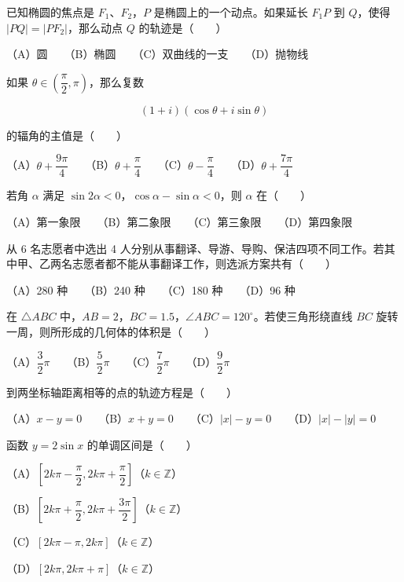 \begin{question}
已知椭圆的焦点是 $F_1\text{、}F_2$，$P$ 是椭圆上的一个动点。如果延长 $F_1P$ 到 $Q$，使得 $|PQ|=|PF_2|$，那么动点 $Q$ 的轨迹是\mbox{（　　）}

（A）圆　　（B）椭圆　　（C）双曲线的一支　　（D）抛物线

\end{question}
\begin{question}
如果 $\theta\in\left(\dfrac\pi2,\pi\right)$，那么复数

\nopagebreak[4]
\[
(1+i)(\cos\theta+i\sin\theta)
\]

的辐角的主值是\mbox{（　　）}

（A）$\theta+\dfrac{9\pi}{4}$　　（B）$\theta+\dfrac\pi4$　　（C）$\theta-\dfrac\pi4$　　（D）$\theta+\dfrac{7\pi}{4}$

\end{question}
\begin{question}
若角 $\alpha$ 满足 $\sin2\alpha<0$，$\cos\alpha-\sin\alpha<0$，则 $\alpha$ 在\mbox{（　　）}

（A）第一象限　　（B）第二象限　　（C）第三象限　　（D）第四象限

\end{question}
\begin{question}
从 6 名志愿者中选出 4 人分别从事翻译、导游、导购、保洁四项不同工作。若其中甲、乙两名志愿者都不能从事翻译工作，则选派方案共有\mbox{（　　）}

（A）280 种　　（B）240 种　　（C）180 种　　（D）96 种

\end{question}
\begin{question}
在 $\triangle ABC$ 中，$AB=2$，$BC=1.5$，$\angle ABC=120^\circ$。若使三角形绕直线 $BC$ 旋转一周，则所形成的几何体的体积是\mbox{（　　）}

（A）$\dfrac32\pi$　　（B）$\dfrac52\pi$　　（C）$\dfrac72\pi$　　（D）$\dfrac92\pi$

\end{question}
\begin{question}
到两坐标轴距离相等的点的轨迹方程是\mbox{（　　）}

（A）$x-y=0$　　（B）$x+y=0$　　（C）$|x|-y=0$　　（D）$|x|-|y|=0$

\end{question}
\begin{question}
函数 $y=2\sin x$ 的单调区间是\mbox{（　　）}

（A）$\left[2k\pi-\dfrac\pi2,2k\pi+\dfrac\pi2\right]$（$k\in\mathbb Z$）

（B）$\left[2k\pi+\dfrac\pi2,2k\pi+\dfrac{3\pi}2\right]$（$k\in\mathbb Z$）

（C）$[2k\pi-\pi,2k\pi]$（$k\in\mathbb Z$）

（D）$[2k\pi,2k\pi+\pi]$（$k\in\mathbb Z$）

\end{question}
